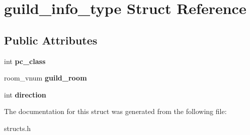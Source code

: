 \hypertarget{structguild__info__type}{}\section{guild\+\_\+info\+\_\+type Struct Reference}
\label{structguild__info__type}
\subsection*{Public Attributes}
\begin{DoxyCompactItemize}
\item 
\mbox{\label{structguild__info__type_a9c7a8d41df7281d5def3466a0cbc38e2}} 
int {\bfseries pc\+\_\+class}
\item 
\mbox{\label{structguild__info__type_a167a2d66b664013b538dfd9074bcde73}} 
room\+\_\+vnum {\bfseries guild\+\_\+room}
\item 
\mbox{\label{structguild__info__type_a96a6ac8e9b5f1299cc3bfff4a40393aa}} 
int {\bfseries direction}
\end{DoxyCompactItemize}


The documentation for this struct was generated from the following file\+:\begin{DoxyCompactItemize}
\item 
structs.\+h\end{DoxyCompactItemize}

